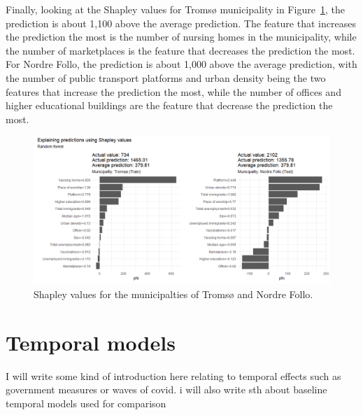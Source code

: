 Finally, looking at the Shapley values for Tromsø municipality in Figure~\ref{shapley_rf_norway}, the prediction is about 1,100 above the average prediction. The feature that increases the prediction the most is the number of nursing homes in the municipality, while the number of marketplaces is the feature that decreases the prediction the most.
For Nordre Follo, the prediction is about 1,000 above the average prediction, with the number of public transport platforms and urban density being the two features that increase the prediction the most, while the number of offices and higher educational buildings are the feature that decrease the prediction the most.
\begin{figure}[H]
  \centering
  \includegraphics[width = \textwidth]{shapley_rf_norway.png}
  \caption{Shapley values for the municipalties of Tromsø and Nordre Follo.}
  \label{shapley_rf_norway}
\end{figure}
\clearpage
\section{Temporal models}
I will write some kind of introduction here relating to temporal effects such as government measures or waves of covid. i will also write sth about baseline temporal models used for comparison

